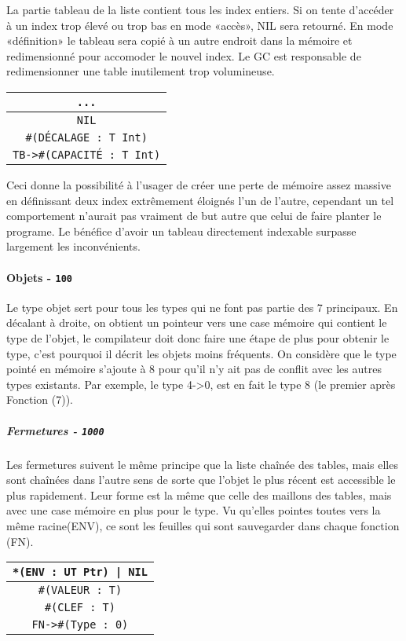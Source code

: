 \documentclass{article}
\begin{document}
La partie tableau de la liste contient tous les index entiers. Si on tente d'accéder à un index trop élevé ou trop bas en mode «accès», NIL sera retourné. En mode «définition» le tableau sera copié à un autre endroit dans la mémoire et redimensionné pour accomoder le nouvel index. Le GC est responsable de redimensionner une table inutilement trop volumineuse.
\begin{center}
\begin{tabular}{|c|}
    \hline
    \texttt{...}\\
    \hline
    \texttt{NIL}\\
    \hline
    \texttt{\#{}(DÉCALAGE : T Int)}\\
    \hline
    \texttt{TB->\#{}(CAPACITÉ : T Int)}\\
    \hline
\end{tabular}
\end{center}
Ceci donne la possibilité à l'usager de créer une perte de mémoire assez massive en définissant deux index extrêmement éloignés l'un de l'autre, cependant un tel comportement n'aurait pas vraiment de but autre que celui de faire planter le programe. Le bénéfice d'avoir un tableau directement indexable surpasse largement les inconvénients.

\newpage
\paragraph{Objets - \texttt{100}}
Le type objet sert pour tous les types qui ne font pas partie des 7 principaux. En décalant à droite, on obtient un pointeur vers une case mémoire qui contient le type de l'objet, le compilateur doit donc faire une étape de plus pour obtenir le type, c'est pourquoi il décrit les objets moins fréquents. On considère que le type pointé en mémoire s'ajoute à 8 pour qu'il n'y ait pas de conflit avec les autres types existants. Par exemple, le type 4->0, est en fait le type 8 (le premier après Fonction (7)).
\setcounter{subparagraph}{-1}
\subparagraph{Fermetures - \texttt{1000}}
Les fermetures suivent le même principe que la liste chaînée des tables, mais elles sont chaînées dans l'autre sens de sorte que l'objet le plus récent est accessible le plus rapidement. Leur forme est la même que celle des maillons des tables, mais avec une case mémoire en plus pour le type. Vu qu'elles pointes toutes vers la même racine(ENV), ce sont les feuilles qui sont sauvegarder dans chaque fonction (FN).

\begin{center}
\begin{tabular}{|c|}
    \hline
    \texttt{*(ENV : UT Ptr) | NIL}\\
    \hline
    \texttt{\#{}(VALEUR : T)}\\
    \hline
    \texttt{\#{}(CLEF : T)}\\
    \hline
    \texttt{FN->\#{}(Type : 0)}\\
    \hline
\end{tabular}
\end{center}
\end{document}
